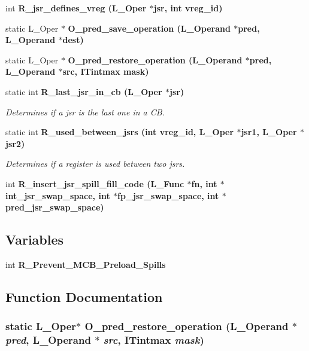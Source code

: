 \begin{CompactItemize}
\item 
int \bf{R\_\-jsr\_\-defines\_\-vreg} (L\_\-Oper $\ast$jsr, int vreg\_\-id)
\item 
static L\_\-Oper $\ast$ \bf{O\_\-pred\_\-save\_\-operation} (L\_\-Operand $\ast$pred, L\_\-Operand $\ast$dest)
\item 
static L\_\-Oper $\ast$ \bf{O\_\-pred\_\-restore\_\-operation} (L\_\-Operand $\ast$pred, L\_\-Operand $\ast$src, \bf{ITintmax} mask)
\item 
static int \bf{R\_\-last\_\-jsr\_\-in\_\-cb} (L\_\-Oper $\ast$jsr)
\begin{CompactList}\small\item\em Determines if a jsr is the last one in a CB. \item\end{CompactList}\item 
static int \bf{R\_\-used\_\-between\_\-jsrs} (int vreg\_\-id, L\_\-Oper $\ast$jsr1, L\_\-Oper $\ast$jsr2)
\begin{CompactList}\small\item\em Determines if a register is used between two jsrs. \item\end{CompactList}\item 
int \bf{R\_\-insert\_\-jsr\_\-spill\_\-fill\_\-code} (L\_\-Func $\ast$fn, int $\ast$int\_\-jsr\_\-swap\_\-space, int $\ast$fp\_\-jsr\_\-swap\_\-space, int $\ast$pred\_\-jsr\_\-swap\_\-space)
\end{CompactItemize}
\subsection*{Variables}
\begin{CompactItemize}
\item 
int \bf{R\_\-Prevent\_\-MCB\_\-Preload\_\-Spills}
\end{CompactItemize}


\subsection{Function Documentation}
\subsubsection{\setlength{\rightskip}{0pt plus 5cm}static L\_\-Oper$\ast$ O\_\-pred\_\-restore\_\-operation (L\_\-Operand $\ast$ {\em pred}, L\_\-Operand $\ast$ {\em src}, \bf{ITintmax} {\em mask})\hspace{0.3cm}{\tt  [static]}}\label{r__regspill_8c_07f079031db330b05de69510cd89c256}




